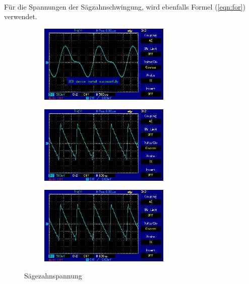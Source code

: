 \\
Für die Spannungen der Sägzahnschwingung, wird ebenfalls Formel (\ref{eqn:for}) verwendet.
\begin{figure}[h]
\centering
\begin{subfigure}{0.48\textwidth}
\centering
\includegraphics[height=3.75cm]{MAP007.jpg}
\label{fig:säg1}
\end{subfigure}
\begin{subfigure}{0.48\textwidth}
\centering
\includegraphics[height=3.75cm]{MAP010.jpg}
\label{fig:säg4}
\end{subfigure}
\begin{subfigure}{0.48\textwidth}
\centering
\includegraphics[height=3.75cm]{MAP011.jpg}
\label{fig:säg5}
\end{subfigure}
\caption{Sägezahnspannung}
\label{fig:säg}
\end{figure}

